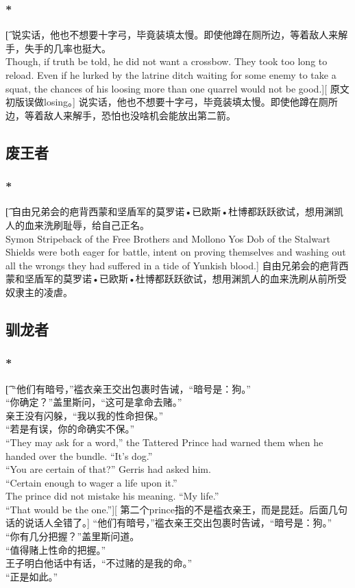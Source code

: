 \documentclass[12pt,a4paper]{article}
\begin{document}
\subsubsection{\color{red}*}\t[
	说实话，他也不想要十字弓，毕竟装填太慢。即使他蹲在厕所边，等着敌人来解手，失手的几率也挺大。\\
	Though, if truth be told, he did not want a crossbow. They took too long to reload. Even if he lurked by the latrine ditch waiting for some enemy to take a squat, the chances of his loosing more than one quarrel would not be good.][
	原文初版误做losing。]
	说实话，他也不想要十字弓，毕竟装填太慢。即使他蹲在厕所边，等着敌人来解手，恐怕也没啥机会能放出第二箭。
	
\subsection{废王者}
\subsubsection{\color{red}*}\t[
	自由兄弟会的疤背西蒙和坚盾军的莫罗诺•已欧斯•杜博都跃跃欲试，想用渊凯人的血来洗刷耻辱，给自己正名。\\
	Symon Stripeback of the Free Brothers and Mollono Yos Dob of the Stalwart Shields were both eager for battle, intent on proving themselves and washing out all the wrongs they had suffered in a tide of Yunkish blood.]
	自由兄弟会的疤背西蒙和坚盾军的莫罗诺•已欧斯•杜博都跃跃欲试，想用渊凯人的血来洗刷从前所受奴隶主的凌虐。
	
\subsection{驯龙者}
\subsubsection{\color{red}*}\t[
	“他们有暗号，”褴衣亲王交出包裹时告诫，“暗号是：狗。”\\
	“你确定？”盖里斯问，“这可是拿命去赌。”\\
	亲王没有闪躲，“我以我的性命担保。”\\
	“若是有误，你的命确实不保。”\\
	“They may ask for a word,” the Tattered Prince had warned them when he handed over the bundle. “It's dog.”\\
	“You are certain of that?” Gerris had asked him.\\
	“Certain enough to wager a life upon it.”\\
	The prince did not mistake his meaning. “My life.”\\
	“That would be the one.”][
	第二个prince指的不是褴衣亲王，而是昆廷。后面几句话的说话人全错了。]
	“他们有暗号，”褴衣亲王交出包裹时告诫，“暗号是：狗。”\\
	“你有几分把握？”盖里斯问道。\\
	“值得赌上性命的把握。”\\
	王子明白他话中有话，“不过赌的是我的命。”\\
	“正是如此。”
\end{document}
